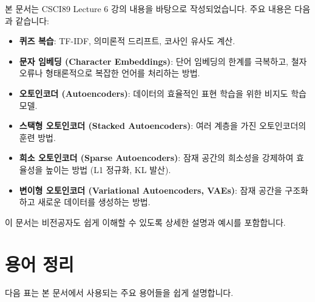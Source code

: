 \documentclass[11pt,a4paper]{article}
\begin{document}
\begin{summarybox}
본 문서는 CSCI89 Lecture 6 강의 내용을 바탕으로 작성되었습니다.
주요 내용은 다음과 같습니다:
\begin{itemize}
    \item \textbf{퀴즈 복습}: TF-IDF, 의미론적 드리프트, 코사인 유사도 계산.
    \item \textbf{문자 임베딩 (Character Embeddings)}: 단어 임베딩의 한계를 극복하고, 철자 오류나 형태론적으로 복잡한 언어를 처리하는 방법.
    \item \textbf{오토인코더 (Autoencoders)}: 데이터의 효율적인 표현 학습을 위한 비지도 학습 모델.
    \item \textbf{스택형 오토인코더 (Stacked Autoencoders)}: 여러 계층을 가진 오토인코더의 훈련 방법.
    \item \textbf{희소 오토인코더 (Sparse Autoencoders)}: 잠재 공간의 희소성을 강제하여 효율성을 높이는 방법 (L1 정규화, KL 발산).
    \item \textbf{변이형 오토인코더 (Variational Autoencoders, VAEs)}: 잠재 공간을 구조화하고 새로운 데이터를 생성하는 방법.
\end{itemize}
이 문서는 비전공자도 쉽게 이해할 수 있도록 상세한 설명과 예시를 포함합니다.
\end{summarybox}

\newpage
\section{용어 정리}
다음 표는 본 문서에서 사용되는 주요 용어들을 쉽게 설명합니다.
\end{document}
